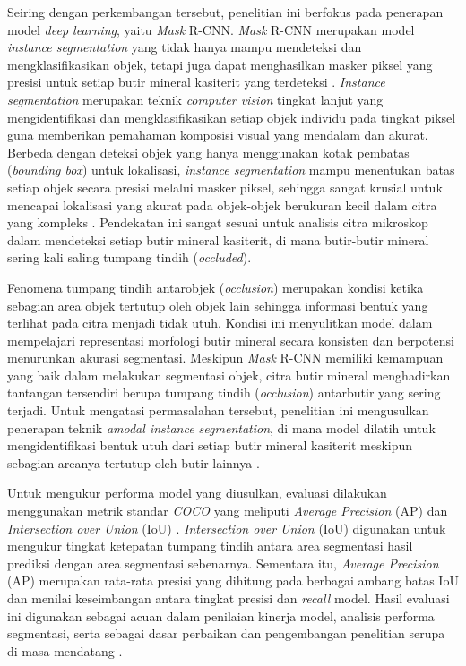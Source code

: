 Seiring dengan perkembangan tersebut, penelitian ini berfokus pada penerapan model \textit{deep learning}, yaitu \textit{Mask} R-CNN. \textit{Mask} R-CNN merupakan model \textit{instance segmentation} yang tidak hanya mampu mendeteksi dan mengklasifikasikan objek, tetapi juga dapat menghasilkan masker piksel yang presisi untuk setiap butir mineral kasiterit yang terdeteksi \cite{MaskRcnnIEEE11}. \textit{Instance segmentation} merupakan teknik \textit{computer vision} tingkat lanjut yang mengidentifikasi dan mengklasifikasikan setiap objek individu pada tingkat piksel guna memberikan pemahaman komposisi visual yang mendalam dan akurat. Berbeda dengan deteksi objek yang hanya menggunakan kotak pembatas (\textit{bounding box}) untuk lokalisasi, \textit{instance segmentation} mampu menentukan batas setiap objek secara presisi melalui masker piksel, sehingga sangat krusial untuk mencapai lokalisasi yang akurat pada objek-objek berukuran kecil dalam citra yang kompleks \cite{segmentasi-deteksiobjek}. Pendekatan ini sangat sesuai untuk analisis citra mikroskop dalam mendeteksi setiap butir mineral kasiterit, di mana butir-butir mineral sering kali saling tumpang tindih (\textit{occluded}). 

Fenomena tumpang tindih antarobjek (\textit{occlusion}) merupakan kondisi ketika sebagian area objek tertutup oleh objek lain sehingga informasi bentuk yang terlihat pada citra menjadi tidak utuh. Kondisi ini menyulitkan model dalam mempelajari representasi morfologi butir mineral secara konsisten dan berpotensi menurunkan akurasi segmentasi. Meskipun \textit{Mask} R-CNN memiliki kemampuan yang baik dalam melakukan segmentasi objek, citra butir mineral menghadirkan tantangan tersendiri berupa tumpang tindih (\textit{occlusion}) antarbutir yang sering terjadi. Untuk mengatasi permasalahan tersebut, penelitian ini mengusulkan penerapan teknik \textit{amodal instance segmentation}, di mana model dilatih untuk mengidentifikasi bentuk utuh dari setiap butir mineral kasiterit meskipun sebagian areanya tertutup oleh butir lainnya \cite{FoodMaskRCNN10}.

Untuk mengukur performa model yang diusulkan, evaluasi dilakukan menggunakan metrik standar \textit{COCO} yang meliputi \textit{Average Precision} (AP) dan \textit{Intersection over Union} (IoU) \cite{MaskRcnnIEEE11}. \textit{Intersection over Union} (IoU) digunakan untuk mengukur tingkat ketepatan tumpang tindih antara area segmentasi hasil prediksi dengan area segmentasi sebenarnya. Sementara itu, \textit{Average Precision} (AP) merupakan rata-rata presisi yang dihitung pada berbagai ambang batas IoU dan menilai keseimbangan antara tingkat presisi dan \textit{recall} model. Hasil evaluasi ini digunakan sebagai acuan dalam penilaian kinerja model, analisis performa segmentasi, serta sebagai dasar perbaikan dan pengembangan penelitian serupa di masa mendatang \cite{OreSegmentation2}. \par

